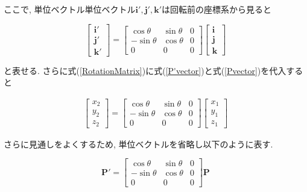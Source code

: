\documentclass{suribt}
\begin{document}
ここで, 単位ベクトル単位ベクトル${\bm i'}, {\bm j'}, {\bm k'}$は回転前の座標系から見ると

\begin{equation}
	\label{RotationMatrix}
	\left[
		\begin{array}{c}
			{\bm i'} \\
			{\bm j'} \\
			{\bm k'}
		\end{array}
	\right]
	=
	\left[
		\begin{array}{ccc}
			\cos \theta & \sin \theta & 0 \\
			-\sin \theta & \cos \theta & 0 \\
			0                & 0                 & 0
		\end{array}
	\right]
	\left[
		\begin{array}{c}
			{\bm i} \\
			{\bm j} \\
			{\bm k}
		\end{array}
	\right]
\end{equation}

と表せる. さらに式(\ref{RotationMatrix})に式(\ref{P'vector})と式(\ref{Pvector})を代入すると

\begin{eqnarray*}
	\left[
		\begin{array}{c}
			x_2 \\
			y_2 \\
			z_2
		\end{array}
	\right]
	=
	\left[
		\begin{array}{ccc}
			\cos \theta & \sin \theta & 0 \\
			-\sin \theta & \cos \theta & 0 \\
			0                & 0                 & 0
		\end{array}
	\right]
	\left[
		\begin{array}{c}
			x_1 \\
			y_1 \\
			z_1
		\end{array}
	\right]
\end{eqnarray*}

さらに見通しをよくするため, 単位ベクトルを省略し以下のように表す.


\begin{equation}
	\label{P-P'RotationMatrix}
	{\bm P'}
	=
	\left[
		\begin{array}{ccc}
			\cos \theta & \sin \theta & 0 \\
			-\sin \theta & \cos \theta & 0 \\
			0                & 0                 & 0
		\end{array}
	\right]
	{\bm P}
\end{equation}
\end{document}

